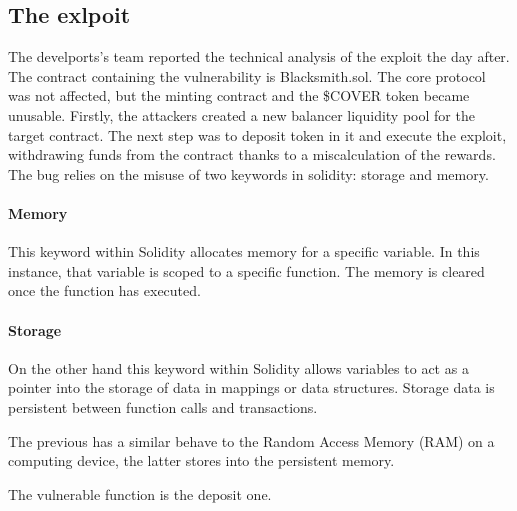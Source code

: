\subsection{The exlpoit}
\label{sec:CoverProtocol:Exploit}
The develports's team reported \citep{CoverProtocolPostMortem} the technical analysis of the exploit the day after.
The contract containing the vulnerability is Blacksmith.sol. The core protocol was not affected, 
but the minting contract and the \$COVER token became unusable.
Firstly, the attackers created a new balancer liquidity pool for the target contract. The next step was to deposit token in it and execute the exploit, 
withdrawing funds from the contract thanks to a miscalculation of the rewards.
The bug relies on the misuse of two keywords in solidity: storage and memory. 

\paragraph{Memory} This keyword within Solidity allocates memory for a specific variable. 
In this instance, that variable is scoped to a specific function. 
The memory is cleared once the function has executed.

\paragraph{Storage} On the other hand this keyword within Solidity allows variables to act as a pointer into the storage of data in mappings or data structures. 
Storage data is persistent between function calls and transactions. 

The previous has a similar behave to the Random Access Memory (RAM) on a computing device, the latter stores into the persistent memory.

The vulnerable function is the deposit one.

